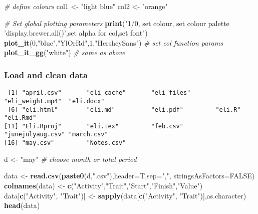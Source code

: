 \documentclass[10,portrait]{article}
\newenvironment{Shaded}{\begin{snugshade}}{\end{snugshade}}
\newcommand{\KeywordTok}[1]{\textcolor[rgb]{0.13,0.29,0.53}{\textbf{#1}}}
\newcommand{\DataTypeTok}[1]{\textcolor[rgb]{0.13,0.29,0.53}{#1}}
\newcommand{\DecValTok}[1]{\textcolor[rgb]{0.00,0.00,0.81}{#1}}
\newcommand{\StringTok}[1]{\textcolor[rgb]{0.31,0.60,0.02}{#1}}
\newcommand{\CommentTok}[1]{\textcolor[rgb]{0.56,0.35,0.01}{\textit{#1}}}
\newcommand{\OtherTok}[1]{\textcolor[rgb]{0.56,0.35,0.01}{#1}}
\newcommand{\OperatorTok}[1]{\textcolor[rgb]{0.81,0.36,0.00}{\textbf{#1}}}
\newcommand{\NormalTok}[1]{#1}
\begin{document}
\begin{Shaded}
\begin{Highlighting}[]
\CommentTok{# define colours  }
\NormalTok{col1 <-}\StringTok{ "light blue"}
\NormalTok{col2 <-}\StringTok{ "orange"}

\CommentTok{# Set global plotting parameters}
\KeywordTok{print}\NormalTok{(}\StringTok{"1/0, set colour, set colour palette 'display.brewer.all()',set alpha for col,set font"}\NormalTok{)}
\KeywordTok{plot_it}\NormalTok{(}\DecValTok{0}\NormalTok{,}\StringTok{"blue"}\NormalTok{,}\StringTok{"YlOrRd"}\NormalTok{,}\DecValTok{1}\NormalTok{,}\StringTok{"HersheySans"}\NormalTok{) }\CommentTok{# set col function params}
\KeywordTok{plot_it_gg}\NormalTok{(}\StringTok{"white"}\NormalTok{) }\CommentTok{# same as above}
\end{Highlighting}
\end{Shaded}

\subsubsection{Load and clean data}\label{load-and-clean-data}

\begin{Shaded}
\end{Shaded}

\begin{verbatim}
 [1] "april.csv"       "eli_cache"       "eli_files"       "eli_weight.mp4"  "eli.docx"       
 [6] "eli.html"        "eli.md"          "eli.pdf"         "eli.R"           "eli.Rmd"        
[11] "Eli.Rproj"       "eli.tex"         "feb.csv"         "junejulyaug.csv" "march.csv"      
[16] "may.csv"         "Notes.csv"      
\end{verbatim}

\begin{Shaded}
\begin{Highlighting}[]
\NormalTok{d <-}\StringTok{ "may"} \CommentTok{# choose month or total period}

\NormalTok{data <-}\StringTok{ }\KeywordTok{read.csv}\NormalTok{(}\KeywordTok{paste0}\NormalTok{(d,}\StringTok{".csv"}\NormalTok{),}\DataTypeTok{header=}\NormalTok{T,}\DataTypeTok{sep=}\StringTok{","}\NormalTok{, }\DataTypeTok{stringsAsFactors=}\OtherTok{FALSE}\NormalTok{)}
\KeywordTok{colnames}\NormalTok{(data) <-}\StringTok{ }\KeywordTok{c}\NormalTok{(}\StringTok{"Activity"}\NormalTok{,}\StringTok{"Trait"}\NormalTok{,}\StringTok{"Start"}\NormalTok{,}\StringTok{"Finish"}\NormalTok{,}\StringTok{"Value"}\NormalTok{)}
\NormalTok{data[}\KeywordTok{c}\NormalTok{(}\StringTok{"Activity"}\NormalTok{, }\StringTok{"Trait"}\NormalTok{)] <-}\StringTok{ }\KeywordTok{sapply}\NormalTok{(data[}\KeywordTok{c}\NormalTok{(}\StringTok{"Activity"}\NormalTok{, }\StringTok{"Trait"}\NormalTok{)],as.character)}
\KeywordTok{head}\NormalTok{(data) }
\end{Highlighting}
\end{Shaded}
\end{document}
